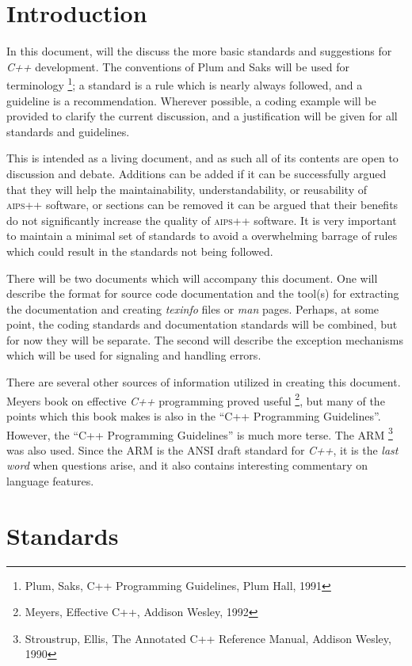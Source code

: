 \section{Introduction}

In this document, will the discuss the more basic standards and suggestions
for \emph{C++} development. The conventions of Plum and Saks
will be used for terminology \footnote{Plum, Saks, C++ Programming Guidelines, 
Plum Hall, 1991}; a standard is a rule which is nearly always followed, 
and a guideline is a recommendation. Wherever possible, a coding example will be provided
to clarify the current discussion, and a justification will be given for all
standards and guidelines.

This is intended as a living document, and as such all of its contents are
open to discussion and debate. Additions can be
added if it can be successfully argued that they will help the maintainability,
understandability, or reusability of \textsc{aips++} software, or sections can be
removed it can be argued that their benefits do not 
significantly increase the quality of \textsc{aips++} software. It is very important to
maintain a minimal set of standards to avoid a overwhelming barrage of
rules which could result in the standards not being followed.

There will be two documents which will accompany this document. One will describe
the format for source code documentation and the tool(s) for extracting the 
documentation and creating \emph{texinfo} files or \emph{man} pages. Perhaps, at
some point, the coding standards and documentation standards will be combined, but
for now they will be separate. The second will describe the exception mechanisms 
which will be used for signaling and handling errors.

There are several other sources of information utilized in creating this 
document. Meyers book on effective \emph{C++} programming
proved useful \footnote{Meyers, Effective C++, Addison Wesley, 1992}, but
many of the points which this book makes is also in the ``C++ Programming Guidelines''.
However, the ``C++ Programming Guidelines'' is much more terse. The \textsc{ARM}
\footnote{Stroustrup, Ellis, The Annotated C++ Reference Manual, 
Addison Wesley, 1990} was also used. Since the \textsc{ARM} is the \textsc{ANSI} draft
standard for \emph{C++}, it is the \emph{last word} when questions arise, and
it also contains interesting commentary on language features.

\section{Standards}

